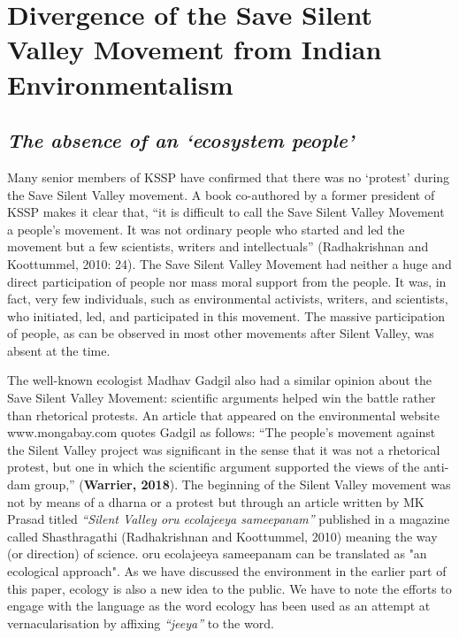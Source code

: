 \documentclass[twoside, 13pt]{article}
\begin{document}
{{{{\fontsize{18}{20}\selectfont\section*{Divergence of the Save Silent Valley Movement from Indian Environmentalism}}

\vspace{-.3cm}

{\fontsize{8}{10}\selectfont \subsection*{\textit{The absence of an ‘ecosystem people’}}}

{\fontsize{12}{14}\selectfont Many senior members of KSSP have confirmed that there was no ‘protest’ during the Save Silent Valley movement. A book co-authored by a former president of KSSP makes it clear that, “it is difficult to call the Save Silent Valley Movement a people’s movement. It was not ordinary people who started and led the movement but a few scientists, writers and intellectuals” (Radhakrishnan and Koottummel, 2010: 24). The Save Silent Valley Movement had neither a huge and direct participation of people nor mass moral support from the people. It was, in fact, very few individuals, such as environmental activists, writers, and scientists, who initiated, led, and participated in this movement. The massive participation of people, as can be observed in most other movements after Silent Valley, was absent at the time.


The well-known ecologist Madhav Gadgil also had a similar opinion about the Save Silent Valley Movement: scientific arguments helped win the battle rather than rhetorical protests. An article that appeared on the environmental website www.mongabay.com quotes Gadgil as follows: “The people’s movement against the Silent Valley project was significant in the sense that it was not a rhetorical protest, but one in which the scientific argument supported the views of the anti-dam group,” (\textbf{Warrier, 2018}). The beginning of the Silent Valley movement was not by means of a dharna or a protest but through an article written by MK Prasad titled \textit{“Silent Valley oru ecolajeeya sameepanam”} published in a magazine called Shasthragathi (Radhakrishnan and Koottummel, 2010) meaning the way (or direction) of science. oru ecolajeeya sameepanam can be translated as "an ecological approach". As we have discussed the environment in the earlier part of this paper, ecology is also a new idea to the public. We have to note the efforts to engage with the language as the word ecology has been used as an attempt at vernacularisation by affixing \textit{“jeeya”} to the word. 


}}}}
\end{document}
